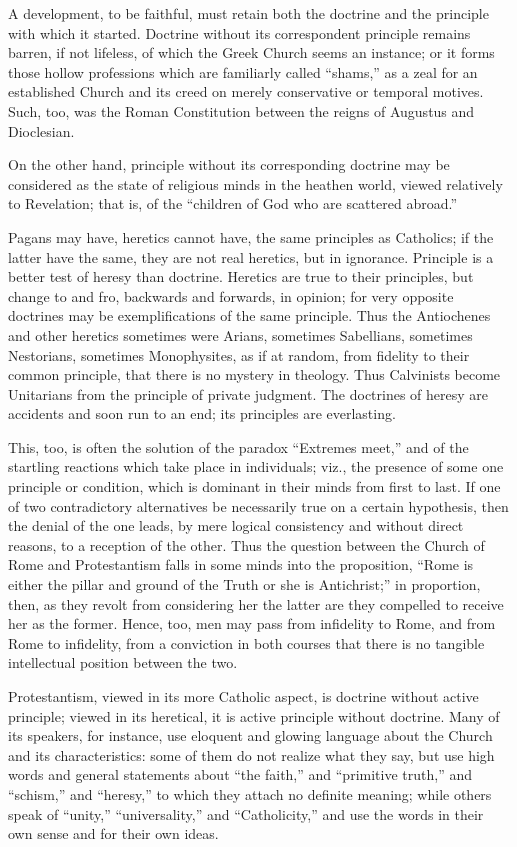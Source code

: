 A development, to be faithful, must retain both the
doctrine and the principle with which it started.
Doctrine without its correspondent principle remains
barren, if not lifeless, of which the Greek Church seems
an instance; or it forms those hollow professions which
are familiarly called ``shams,'' as a zeal for an
established Church and its creed on merely conservative
or temporal motives. Such, too, was the Roman
Constitution between the reigns of Augustus and
Dioclesian.

On the other hand, principle without its corresponding
doctrine may be considered as the state of religious
minds in the heathen world, viewed relatively to
Revelation; that is, of the ``children of God who are
scattered abroad.''

Pagans may have, heretics cannot have, the same
principles as Catholics; if the latter have the same,
they are not real heretics, but in ignorance. Principle
is a better test of heresy than doctrine. Heretics are
true to their principles, but change to and fro,
backwards and forwards, in opinion; for very opposite
doctrines may be exemplifications of the same principle.
Thus the Antiochenes and other heretics sometimes were
Arians, sometimes Sabellians, sometimes Nestorians,
sometimes Monophysites, as if at random, from fidelity to
their common principle, that there is no mystery in
theology. Thus Calvinists become Unitarians from the
principle of private judgment. The doctrines of heresy
are accidents and soon run to an end; its principles are
everlasting.

This, too, is often the solution of the paradox
``Extremes meet,'' and of the startling reactions
which take place in individuals; viz., the presence of
some one principle or condition, which is dominant in
their minds from first to last. If one of two
contradictory alternatives be necessarily true on a
certain hypothesis, then the denial of the one leads, by
mere logical consistency and without direct reasons, to a
reception of the other. Thus the question between the
Church of Rome and Protestantism falls in some minds into
the proposition, ``Rome is either the pillar and
ground of the Truth or she is Antichrist;'' in
proportion, then, as they revolt from considering her the
latter are they compelled to receive her as the former.
Hence, too, men may pass from infidelity to Rome, and
from Rome to infidelity, from a conviction in both
courses that there is no tangible intellectual position
between the two.

Protestantism, viewed in its more Catholic aspect, is
doctrine without active principle; viewed in its
heretical, it is active principle without doctrine. Many
of its speakers, for instance, use eloquent and glowing
language about the Church and its characteristics: some
of them do not realize what they say, but use high words
and general statements about ``the faith,'' and
``primitive truth,'' and ``schism,'' and
``heresy,'' to which they attach no definite
meaning; while others speak of ``unity,''
``universality,'' and ``Catholicity,''
and use the words in their own sense and for their own
ideas.

